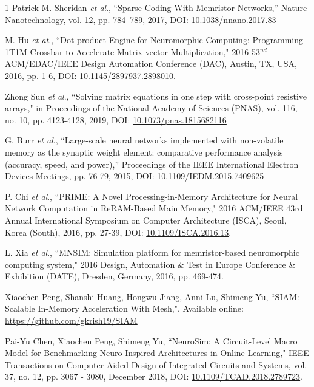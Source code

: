 \documentclass[journal]{IEEEtran}
\begin{document}
\begin{thebibliography}{1}
Patrick M. Sheridan \emph{et al}., ``Sparse Coding With Memristor Networks,'' Nature Nanotechnology, vol. 12, pp. 784–789, 2017, DOI: \href{https://www.nature.com/articles/nnano.2017.83}{10.1038/nnano.2017.83} 

M. Hu \emph{et at}., ``Dot-product Engine for Neuromorphic Computing: Programming 1T1M Crossbar to Accelerate Matrix-vector Multiplication," 2016 53$^{nd}$ ACM/EDAC/IEEE Design Automation Conference (DAC), Austin, TX, USA, 2016, pp. 1-6, DOI: \href{https://ieeexplore.ieee.org/document/7544263}{10.1145/2897937.2898010}.

Zhong Sun \emph{et al}., ``Solving matrix equations in one step with cross-point resistive arrays," in Proceedings of the National Academy of Sciences (PNAS), vol. 116, no. 10, pp. 4123-4128, 2019, DOI: \href{https://DOI.org/10.1073/pnas.1815682116} {10.1073/pnas.1815682116}

G. Burr \emph{et al}., ``Large-scale neural networks implemented with non-volatile memory as the synaptic weight element: comparative performance analysis (accuracy, speed, and power),” Proceedings of the IEEE International Electron Devices Meetings, pp. 76-79, 2015, DOI: \href{https://ieeexplore.ieee.org/document/7409625}{10.1109/IEDM.2015.7409625}


P. Chi \emph{et al}., ``PRIME: A Novel Processing-in-Memory Architecture for Neural Network Computation in ReRAM-Based Main Memory," 2016 ACM/IEEE 43rd Annual International Symposium on Computer Architecture (ISCA), Seoul, Korea (South), 2016, pp. 27-39, DOI: \href{https://ieeexplore.ieee.org/document/7551380} {10.1109/ISCA.2016.13}.

L. Xia \emph{et al}., ``MNSIM: Simulation platform for memristor-based neuromorphic computing system," 2016 Design, Automation \& Test in Europe Conference \& Exhibition (DATE), Dresden, Germany, 2016, pp. 469-474.

Xiaochen Peng, Shanshi Huang, Hongwu Jiang, Anni Lu, Shimeng Yu, ``SIAM: Scalable In-Memory Acceleration With Mesh,". Available online: \href{https://github.com/gkrish19/SIAM}{https://github.com/gkrish19/SIAM}

Pai-Yu Chen, Xiaochen Peng, Shimeng Yu, ``NeuroSim: A Circuit-Level Macro Model for Benchmarking Neuro-Inspired Architectures in Online Learning," IEEE Transactions on Computer-Aided Design of Integrated Circuits and Systems, vol. 37, no. 12, pp. 3067 - 3080, December 2018, DOI: \href{https://ieeexplore.ieee.org/document/8246561} {10.1109/TCAD.2018.2789723}.


\end{thebibliography}
\end{document}
